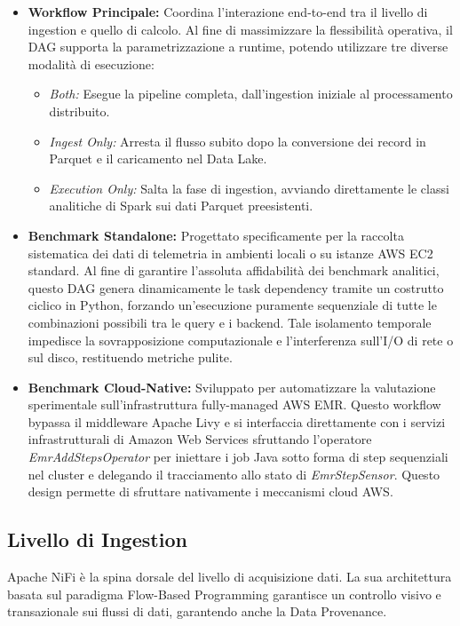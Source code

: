 \documentclass[conference]{IEEEtran}
\begin{document}
\begin{itemize}
    \item[\textbf{1)}] \textbf{Workflow Principale:} Coordina l'interazione end-to-end tra il livello di ingestion e quello di calcolo.
    Al fine di massimizzare la flessibilità operativa, il DAG supporta la parametrizzazione a runtime, potendo utilizzare tre diverse modalità di esecuzione:
    \begin{itemize}
        \item \textit{Both:} Esegue la pipeline completa, dall'ingestion iniziale al processamento distribuito.
        \item \textit{Ingest Only:} Arresta il flusso subito dopo la conversione dei record in Parquet e il caricamento nel Data Lake.
        \item \textit{Execution Only:} Salta la fase di ingestion, avviando direttamente le classi analitiche di Spark sui dati Parquet preesistenti.
    \end{itemize}
    \vspace{0.1cm}

    \item[\textbf{2)}] \textbf{Benchmark Standalone:} Progettato specificamente per la raccolta sistematica dei dati di telemetria in ambienti locali o su istanze AWS EC2 standard.
    Al fine di garantire l'assoluta affidabilità dei benchmark analitici, questo DAG genera dinamicamente le task dependency tramite un costrutto ciclico in Python, forzando un'esecuzione puramente sequenziale di tutte le combinazioni possibili tra le query e i backend.
    Tale isolamento temporale impedisce la sovrapposizione computazionale e l'interferenza sull'I/O di rete o sul disco, restituendo metriche pulite.
    \vspace{0.1cm}

    \item[\textbf{3)}] \textbf{Benchmark Cloud-Native:} Sviluppato per automatizzare la valutazione sperimentale sull'infrastruttura fully-managed AWS EMR.
    Questo workflow bypassa il middleware Apache Livy e si interfaccia direttamente con i servizi infrastrutturali di Amazon Web Services sfruttando l'operatore \textit{EmrAddStepsOperator} per iniettare i job Java sotto forma di step sequenziali nel cluster e delegando il tracciamento allo stato di \textit{EmrStepSensor}.
    Questo design permette di sfruttare nativamente i meccanismi cloud AWS\@.
\end{itemize}

\subsection{Livello di Ingestion}\label{subsec:ingestion_layer}
Apache NiFi è la spina dorsale del livello di acquisizione dati.
La sua architettura basata sul paradigma Flow-Based Programming garantisce un controllo visivo e transazionale sui flussi di dati, garantendo anche la Data Provenance\@.
\end{document}
